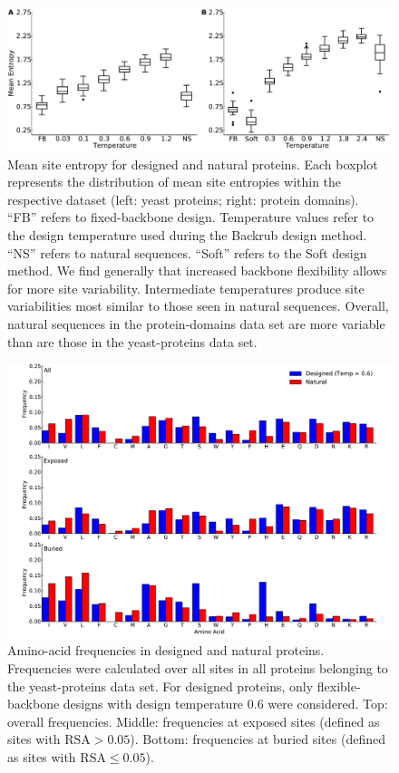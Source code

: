 \documentclass[12pt]{article}
\begin{document}
\begin{figure}[H]
\centerline{\includegraphics[width = 6in]{figures/Mean_Entropy_vs_Temp_Combo_Boxplot.pdf}} %
\caption{Mean site entropy for designed and natural proteins. Each boxplot represents the distribution of mean site entropies within the respective dataset (left: yeast proteins; right: protein domains). ``FB'' refers to fixed-backbone design. Temperature values refer to the design temperature used during the Backrub design method. ``NS'' refers to natural sequences. ``Soft'' refers to the Soft design method. We find generally that increased backbone flexibility allows for more site variability. Intermediate temperatures produce site variabilities most similar to those seen in natural sequences. Overall, natural sequences in the protein-domains data set are more variable than are those in the yeast-proteins data set.}
\label{MeanEntropyComparison}
\end{figure}


\begin{figure}[H]
\centerline{\includegraphics[width = 5in]{figures/Duncan_Freq_Combo_Plots_06.pdf}}
\caption{Amino-acid frequencies in designed and natural proteins. Frequencies were calculated over all sites in all proteins belonging to the yeast-proteins data set. For designed proteins, only flexible-backbone designs with design temperature 0.6 were considered. Top: overall frequencies. Middle: frequencies at exposed sites (defined as sites with $\text{RSA}>0.05$). Bottom: frequencies at buried sites (defined as sites with $\text{RSA}\leq0.05$).}
\label{AAFreqsYeastProteins}
\end{figure}
\end{document}
